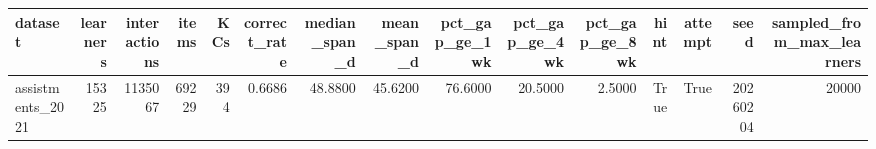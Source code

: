 \begin{tabular}{lrrrrrrrrrrrrrr}
\toprule
dataset & learners & interactions & items & KCs & correct\_rate & median\_span\_d & mean\_span\_d & pct\_gap\_ge\_1wk & pct\_gap\_ge\_4wk & pct\_gap\_ge\_8wk & hint & attempt & seed & sampled\_from\_max\_learners \\
\midrule
assistments\_2021 & 15325 & 1135067 & 69229 & 394 & 0.6686 & 48.8800 & 45.6200 & 76.6000 & 20.5000 & 2.5000 & True & True & 20260204 & 20000 \\
\bottomrule
\end{tabular}

